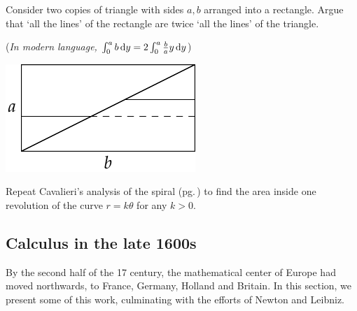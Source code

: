 \begin{exercises}{}{}
\begin{enumerate}
	\begin{minipage}[t]{0.6\linewidth}\vspace{0pt}
	\item Consider two copies of triangle with sides $a,b$ arranged into a rectangle. Argue that `all the lines' of the rectangle are twice `all the lines' of the triangle.\par
(\emph{In modern language, $\int_0^ab\,{\mathrm{d} y}=2\int_0^a\frac bay\,{\mathrm{d} y}$}) 
	\end{minipage}\hfill\begin{minipage}[t]{0.39\linewidth}\vspace{0pt}
	\flushright\includegraphics{analytic-torri3}
	\end{minipage}\par
	
	\item Repeat Cavalieri's analysis of the spiral (pg.\,\pageref{pg:cavspiral}) to find the area inside one revolution of the curve $r=k\theta$ for any $k>0$.
	
\end{enumerate}
\end{exercises}


\clearpage




\subsection{Calculus in the late 1600s}

By the second half of the 17\th{} century, the mathematical center of Europe had moved northwards, to France, Germany, Holland and Britain. In this section, we present some of this work, culminating with the efforts of Newton and Leibniz.\par

